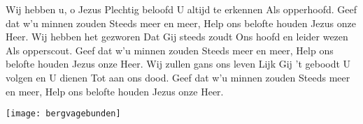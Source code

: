 \beginverse
Wij hebben u, o Jezus
Plechtig beloofd
U altijd te erkennen
Als opperhoofd.
\endverse
\beginchorus
Geef dat w'u minnen zouden
Steeds meer en meer,
Help ons belofte houden
Jezus onze Heer.
\endchorus
\beginverse
Wij hebben het gezworen
Dat Gij steeds zoudt
Ons hoofd en leider wezen
Als opperscout.
\endverse
\beginverse
Geef dat w'u minnen zouden
Steeds meer en meer,
Help ons belofte houden
Jezus onze Heer.
\endverse
\beginverse
Wij zullen gans ons leven
Lijk Gij 't geboodt
U volgen en U dienen
Tot aan ons dood.
\endverse
\beginverse
Geef dat w'u minnen zouden
Steeds meer en meer,
Help ons belofte houden
Jezus onze Heer.
\endverse
\endsong
\begin{intersong}
    \texttt{[image: bergvagebunden]}
\end{intersong}